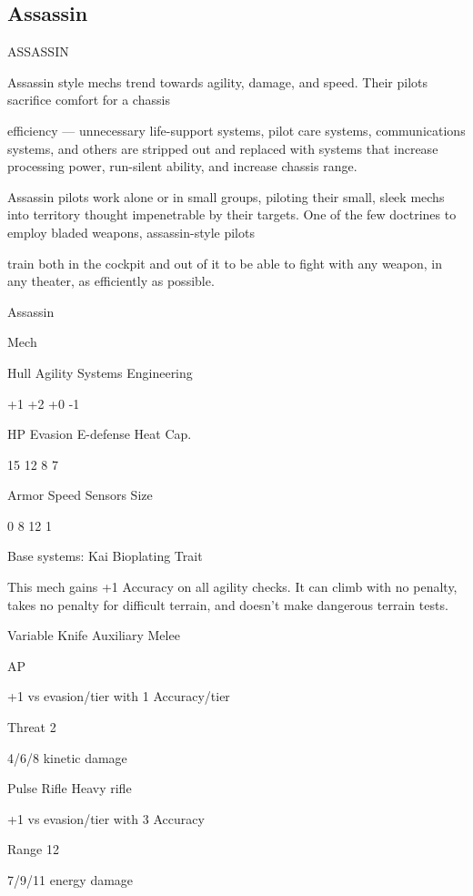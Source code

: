 \subsection{Assassin}

                                                 ASSASSIN

Assassin style mechs trend towards agility, damage, and speed. Their pilots sacrifice comfort for a chassis

efficiency — unnecessary life-support systems, pilot care systems, communications systems, and others
are stripped out and replaced with systems that increase processing power, run-silent ability, and increase
chassis range.

Assassin pilots work alone or in small groups, piloting their small, sleek mechs into territory thought
impenetrable by their targets. One of the few doctrines to employ bladed weapons, assassin-style pilots

train both in the cockpit and out of it to be able to fight with any weapon, in any theater, as efficiently as
possible.

 Assassin

 Mech

 Hull        Agility      Systems        Engineering

 +1          +2           +0             -1

 HP          Evasion      E-defense      Heat Cap.

  15         12           8              7

 Armor       Speed        Sensors       Size

 0           8            12             1

Base systems:
Kai Bioplating
Trait

This mech gains +1 Accuracy on all agility checks. It can climb with no penalty, takes no penalty
for difficult terrain, and doesn’t make dangerous terrain tests.


Variable Knife
Auxiliary Melee

AP

+1 vs evasion/tier with 1 Accuracy/tier

Threat 2

4/6/8 kinetic damage


Pulse Rifle
Heavy rifle

+1 vs evasion/tier with 3 Accuracy

Range 12

7/9/11 energy damage





